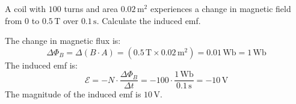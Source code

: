 \begin{Exercise}[title={Induced EMF in a Coil}, label=induced_emf_coil]
A coil with $100$ turns and area $0.02\,\mathrm{m}^2$ experiences a change in magnetic field from $0$ to $0.5\,\mathrm{T}$ over $0.1\,\mathrm{s}$. Calculate the induced emf.
\end{Exercise}
\begin{Answer}[ref=induced_emf_coil]
The change in magnetic flux is:
\[
\Delta \Phi_B = \Delta(B \cdot A) = (0.5\,\mathrm{T} \times 0.02\,\mathrm{m}^2)
= 0.01\,\mathrm{Wb} = 1\,\mathrm{Wb}
\]
The induced emf is:
\[
\mathcal{E} = -N \cdot \frac{\Delta \Phi_B}{\Delta t} = -100 \cdot \frac{1\,\mathrm{Wb}}{0.1\,\mathrm{s}} = -10\,\mathrm{V}
\]
The magnitude of the induced emf is $10\,\mathrm{V}$.
\end{Answer}